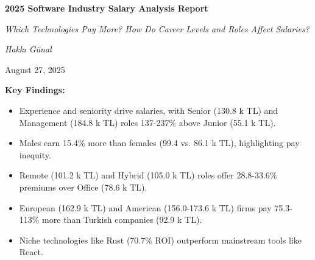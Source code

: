 \documentclass[12pt,a4paper]{article}
\begin{document}
\thispagestyle{empty}

\begin{titlepage}
    \centering
    \vfill
    \vspace*{1.5cm}
    \vspace{1cm}
    {\Huge \bfseries \color{titleblue} 2025 Software Industry Salary Analysis Report\par}
    \vspace{0.5cm}
    {\Large \itshape \color{darkgray} Which Technologies Pay More? How Do Career Levels and Roles Affect Salaries?\par}
    \vspace{1cm}
    {\Large \itshape Hakkı Günal\par}
    \vspace{0.5cm}
    {\large August 27, 2025\par}
    \vspace{1cm}
    {\normalsize
        \begin{minipage}{0.8\textwidth}
            \centering
            \color{darkgray}
            \textbf{Key Findings:}
            \begin{itemize}
                \item Experience and seniority drive salaries, with Senior (130.8 k TL) and Management (184.8 k TL) roles 137-237\% above Junior (55.1 k TL).
                \item Males earn 15.4\% more than females (99.4 vs. 86.1 k TL), highlighting pay inequity.
                \item Remote (101.2 k TL) and Hybrid (105.0 k TL) roles offer 28.8-33.6\% premiums over Office (78.6 k TL).
                \item European (162.9 k TL) and American (156.0-173.6 k TL) firms pay 75.3-113\% more than Turkish companies (92.9 k TL).
                \item Niche technologies like Rust (70.7\% ROI) outperform mainstream tools like React.
            \end{itemize}

\end{minipage}}
\end{titlepage}
\end{document}
